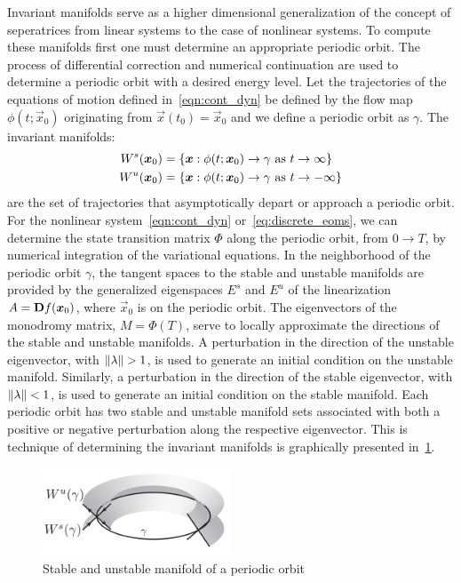 \documentclass[preprint]{elsarticle}
\begin{document}
Invariant manifolds serve as a higher dimensional generalization of the concept of seperatrices from linear systems to the case of nonlinear systems. 
To compute these manifolds first one must determine an appropriate periodic orbit. 
The process of differential correction and numerical continuation are used to determine a periodic orbit with a desired energy level. 
Let the trajectories of the equations of motion defined in~\cref{eqn:cont_dyn} be defined by the flow map \( \phi(t;\vec{x}_0) \) originating from \( \vec{x}(t_0) = \vec{x}_0 \) and we define a periodic orbit as \( \gamma\).
The invariant manifolds: 
\begin{align*}
	W^s ( \boldsymbol{x}_0 ) &= \left\{  \boldsymbol{x} : \phi(t;\boldsymbol{x}_0) \to \gamma \text{ as } t \to \infty \right\} \\
	W^u ( \boldsymbol{x}_0 ) &= \left\{  \boldsymbol{x} : \phi(t;\boldsymbol{x}_0) \to \gamma \text{ as } t \to -\infty \right\} 
\end{align*}
are the set of trajectories that asymptotically depart or approach a periodic orbit.
For the nonlinear system~\cref{eqn:cont_dyn} or~\cref{eq:discrete_eoms}, we can determine the state transition matrix \( \Phi \) along the periodic orbit, from \( 0 \to T\), by numerical integration of the variational equations.
In the neighborhood of the periodic orbit \( \gamma \), the tangent spaces to the stable and unstable manifolds are provided by the generalized eigenspaces \( E^s \) and \( E^u \) of the linearization \( A = \mathbf{D} f(\boldsymbol{x}_0) \), where \( \vec{x}_0 \) is on the periodic orbit.
The eigenvectors of the monodromy matrix, \( M = \Phi(T) \), serve to locally approximate the directions of the stable and unstable manifolds. 
A perturbation in the direction of the unstable eigenvector, with \( \left\| \lambda \right\| > 1 \), is used to generate an initial condition on the unstable manifold. 
Similarly, a perturbation in the direction of the stable eigenvector, with \( \left\| \lambda \right\| < 1 \), is used to generate an initial condition on the stable manifold. 
Each periodic orbit has two stable and unstable manifold sets associated with both a positive or negative perturbation along the respective eigenvector.
This is technique of determining the invariant manifolds is graphically presented in~\cref{fig:invariant_manifold}.
\begin{figure}
	\centering
	\includegraphics[width=0.5\textwidth]{invariant_manifold}
	\caption{Stable and unstable manifold of a periodic orbit\label{fig:invariant_manifold}}
\end{figure}
\end{document}
